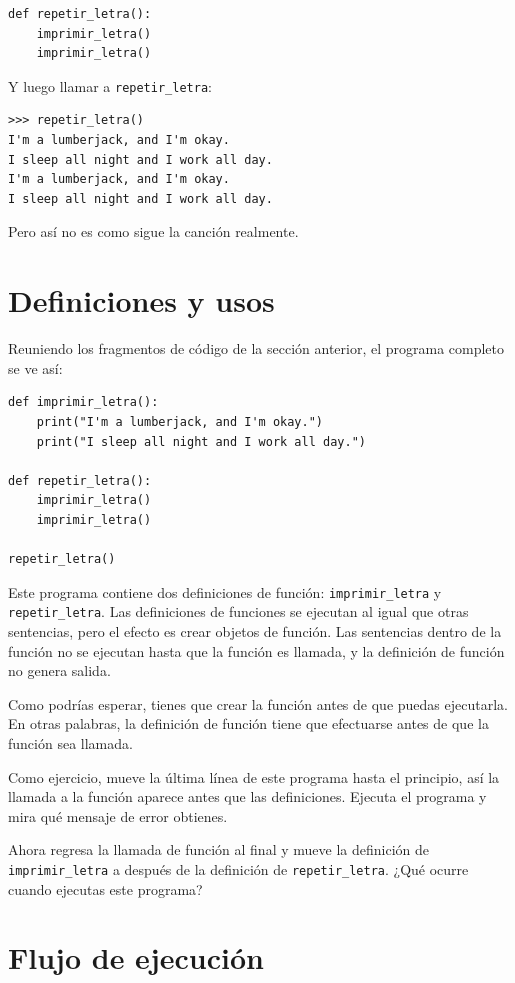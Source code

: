\documentclass[10pt]{book}
\begin{document}
\begin{verbatim}
def repetir_letra():
    imprimir_letra()
    imprimir_letra()
\end{verbatim}
%
Y luego llamar a \verb"repetir_letra":

\begin{verbatim}
>>> repetir_letra()
I'm a lumberjack, and I'm okay.
I sleep all night and I work all day.
I'm a lumberjack, and I'm okay.
I sleep all night and I work all day.
\end{verbatim}
%
Pero así no es como sigue la canción realmente.


\section{Definiciones y usos}

Reuniendo los fragmentos de código de la sección anterior, el
programa completo se ve así:

\begin{verbatim}
def imprimir_letra():
    print("I'm a lumberjack, and I'm okay.")
    print("I sleep all night and I work all day.")

def repetir_letra():
    imprimir_letra()
    imprimir_letra()

repetir_letra()
\end{verbatim}
%
Este programa contiene dos definiciones de función: \verb"imprimir_letra" y
\verb"repetir_letra".  Las definiciones de funciones se ejecutan al igual que otras
sentencias, pero el efecto es crear objetos de función.  Las sentencias
dentro de la función no se ejecutan hasta que la función es llamada, y
la definición de función no genera salida.

Como podrías esperar, tienes que crear la función antes de que puedas
ejecutarla.  En otras palabras, la definición de función tiene que efectuarse
antes de que la función sea llamada.

Como ejercicio, mueve la última línea de este programa
hasta el principio, así la llamada a la función aparece antes que las definiciones. Ejecuta
el programa y mira qué mensaje
de error obtienes.

Ahora regresa la llamada de función al final
y mueve la definición de \verb"imprimir_letra" a después de la definición de
\verb"repetir_letra".  ¿Qué ocurre cuando ejecutas este programa?


\section{Flujo de ejecución}
\end{document}
